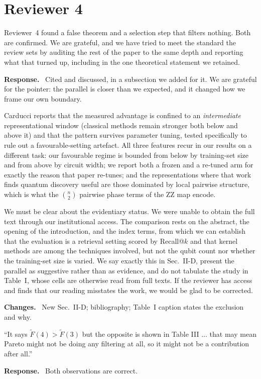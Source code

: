\documentclass[11pt,a4paper]{article}
\newenvironment{revcomment}
  {\par\addvspace{6pt}\begingroup
   \color{quotegray}\itshape\small
   \begin{list}{}{%
     \setlength{\leftmargin}{1.8em}\setlength{\rightmargin}{1.0em}%
     \setlength{\topsep}{0pt}\setlength{\partopsep}{0pt}%
     \setlength{\parsep}{3pt}\setlength{\itemsep}{0pt}}%
   \item[]}
  {\end{list}\endgroup\normalcolor\addvspace{6pt}}
\newcommand{\itemhead}[2]{%
  \par\addvspace{15pt}%
  \noindent{\bfseries\color{tagink}#1}\hspace{0.7em}{\bfseries #2}%
  \par\addvspace{3.5pt}%
  \noindent{\color{rulegray}\rule{\linewidth}{0.5pt}}%
  \par\addvspace{5pt}%
  \nobreak}
\newcommand{\resp}{\par\addvspace{2pt}\noindent\textbf{Response.}\ }
\newcommand{\changed}{\par\addvspace{5pt}\noindent
  {\bfseries\color{tagink}Changes.}\ }
\begin{document}
\section{Reviewer 4}

Reviewer~4 found a false theorem and a selection step that filters nothing. Both
are confirmed. We are grateful, and we have tried to meet the standard the
review sets by auditing the rest of the paper to the same depth and reporting
what that turned up, including in the one theoretical statement we retained.

\itemhead{R4-1}{Related work: Carducci, ICAD 2026, on the same question for
malware detection}
\resp
Cited and discussed, in a subsection we added for it. We are grateful for the
pointer: the parallel is closer than we expected, and it changed how we frame
our own boundary.

Carducci reports that the measured advantage is confined to an
\emph{intermediate} representational window (classical methods remain
stronger both below and above it) and that the pattern survives parameter
tuning, tested specifically to rule out a favourable-setting artefact. All three
features recur in our results on a different task: our favourable regime is
bounded from below by training-set size and from above by circuit width; we
report both a frozen and a re-tuned arm for exactly the reason that paper
re-tunes; and the representations where that work finds quantum discovery useful
are those dominated by local pairwise structure, which is what the
$\binom{n}{2}$ pairwise phase terms of the ZZ map encode.

We must be clear about the evidentiary status. We were unable to obtain the full
text through our institutional access. The comparison rests on the abstract, the
opening of the introduction, and the index terms, from which we can establish
that the evaluation is a retrieval setting scored by Recall@$k$ and that kernel
methods are among the techniques involved, but not the qubit count nor whether
the training-set size is varied. We say exactly this in Sec.~II-D, present the
parallel as suggestive rather than as evidence, and do not tabulate the study in
Table~I, whose cells are otherwise read from full texts. If the reviewer has
access and finds that our reading misstates the work, we would be glad to be
corrected.
\changed
New Sec.~II-D; bibliography; Table~I caption states the exclusion and why.

\itemhead{R4-2}{Theorem~1 appears misstated; and the Pareto step may not filter
anything}
\begin{revcomment}
``It says $\tilde F(4) > \tilde F(3)$ but the opposite is shown in Table III
$\ldots$ that may mean Pareto might not be doing any filtering at all, so it
might not be a contribution after all.''
\end{revcomment}
\resp
Both observations are correct.
\end{document}
